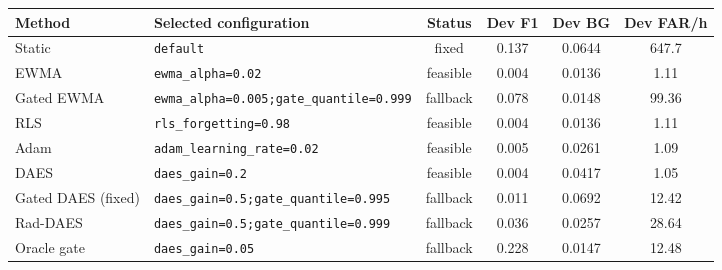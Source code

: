 \begin{tabular}{llcccc}
\toprule
Method & Selected configuration & Status & Dev F1 & Dev BG & Dev FAR/h \\
\midrule
Static & \texttt{default} & fixed & 0.137 & 0.0644 & 647.7 \\
EWMA & \texttt{ewma\_alpha=0.02} & feasible & 0.004 & 0.0136 & 1.11 \\
Gated EWMA & \texttt{ewma\_alpha=0.005;gate\_quantile=0.999} & fallback & 0.078 & 0.0148 & 99.36 \\
RLS & \texttt{rls\_forgetting=0.98} & feasible & 0.004 & 0.0136 & 1.11 \\
Adam & \texttt{adam\_learning\_rate=0.02} & feasible & 0.005 & 0.0261 & 1.09 \\
DAES & \texttt{daes\_gain=0.2} & feasible & 0.004 & 0.0417 & 1.05 \\
Gated DAES (fixed) & \texttt{daes\_gain=0.5;gate\_quantile=0.995} & fallback & 0.011 & 0.0692 & 12.42 \\
Rad-DAES & \texttt{daes\_gain=0.5;gate\_quantile=0.999} & fallback & 0.036 & 0.0257 & 28.64 \\
Oracle gate & \texttt{daes\_gain=0.05} & fallback & 0.228 & 0.0147 & 12.48 \\
\bottomrule
\end{tabular}
